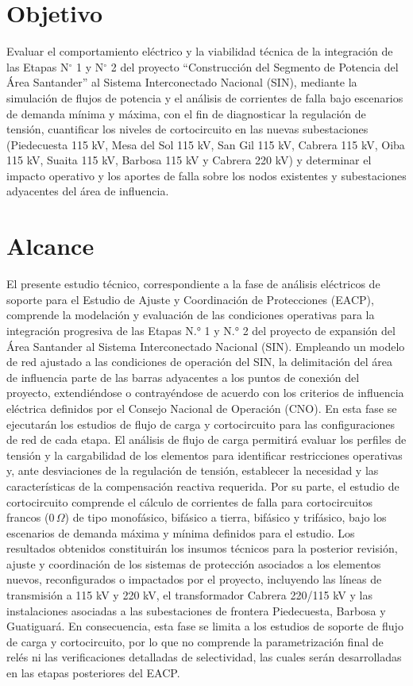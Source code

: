 \section{Objetivo}
Evaluar el comportamiento eléctrico y la viabilidad técnica de la integración de las Etapas N$^\circ$ 1 y N$^\circ$ 2 del proyecto ``Construcción del Segmento de Potencia del Área Santander'' al Sistema Interconectado Nacional (SIN), mediante la simulación de flujos de potencia y el análisis de corrientes de falla bajo escenarios de demanda mínima y máxima, con el fin de diagnosticar la regulación de tensión, cuantificar los niveles de cortocircuito en las nuevas subestaciones (Piedecuesta 115 kV, Mesa del Sol 115 kV, San Gil 115 kV, Cabrera 115 kV, Oiba 115 kV, Suaita 115 kV, Barbosa 115 kV y Cabrera 220 kV) y determinar el impacto operativo y los aportes de falla sobre los nodos existentes y subestaciones adyacentes del área de influencia.

\section{Alcance}
El presente estudio técnico, correspondiente a la fase de análisis eléctricos de soporte para el Estudio de Ajuste y Coordinación de Protecciones (EACP), comprende la modelación y evaluación de las condiciones operativas para la integración progresiva de las Etapas N.° 1 y N.° 2 del proyecto de expansión del Área Santander al Sistema Interconectado Nacional (SIN). Empleando un modelo de red ajustado a las condiciones de operación del SIN, la delimitación del área de influencia parte de las barras adyacentes a los puntos de conexión del proyecto, extendiéndose o contrayéndose de acuerdo con los criterios de influencia eléctrica definidos por el Consejo Nacional de Operación (CNO). En esta fase se ejecutarán los estudios de flujo de carga y cortocircuito para las configuraciones de red de cada etapa. El análisis de flujo de carga permitirá evaluar los perfiles de tensión y la cargabilidad de los elementos para identificar restricciones operativas y, ante desviaciones de la regulación de tensión, establecer la necesidad y las características de la compensación reactiva requerida. Por su parte, el estudio de cortocircuito comprende el cálculo de corrientes de falla para cortocircuitos francos (\(0\,\Omega\)) de tipo monofásico, bifásico a tierra, bifásico y trifásico, bajo los escenarios de demanda máxima y mínima definidos para el estudio. Los resultados obtenidos constituirán los insumos técnicos para la posterior revisión, ajuste y coordinación de los sistemas de protección asociados a los elementos nuevos, reconfigurados o impactados por el proyecto, incluyendo las líneas de transmisión a 115 kV y 220 kV, el transformador Cabrera 220/115 kV y las instalaciones asociadas a las subestaciones de frontera Piedecuesta, Barbosa y Guatiguará. En consecuencia, esta fase se limita a los estudios de soporte de flujo de carga y cortocircuito, por lo que no comprende la parametrización final de relés ni las verificaciones detalladas de selectividad, las cuales serán desarrolladas en las etapas posteriores del EACP.

